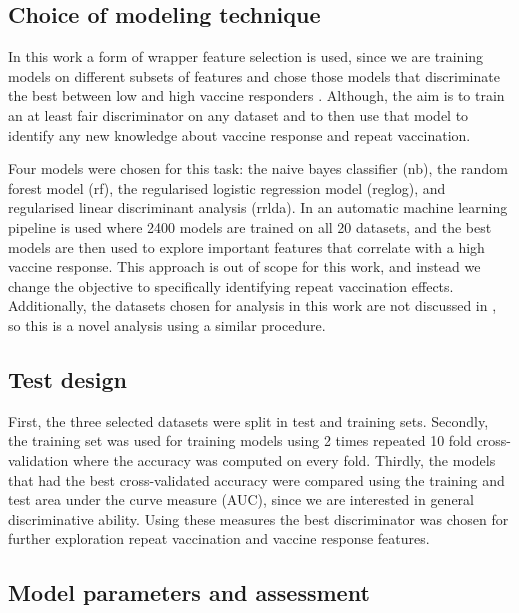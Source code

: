 \subsection{Choice of modeling technique}

In this work a form of wrapper feature selection is used, since we are training models on different subsets of features and chose those models that discriminate the best between low and high vaccine responders \citep{hiraReviewFeatureSelection2015}.
Although, the aim is to train an at least fair discriminator on any dataset and to then use that model to identify any new knowledge about vaccine response and repeat vaccination.

Four models were chosen for this task: the naive bayes classifier (nb), the random forest model (rf), the regularised logistic regression model (reglog), and regularised linear discriminant analysis (rrlda).
In \spaper an automatic machine learning pipeline is used where 2400 models are trained on all 20 datasets, and the best models are then used to explore important features that correlate with a high vaccine response.
This approach is out of scope for this work, and instead we change the objective to specifically identifying repeat vaccination effects.
Additionally, the datasets chosen for analysis in this work are not discussed in \spaper, so this is a novel analysis using a similar procedure.

\subsection{Test design}

First, the three selected datasets were split in test and training sets.
Secondly, the training set was used for training models using 2 times repeated 10 fold cross-validation where the accuracy was computed on every fold.
Thirdly, the models that had the best cross-validated accuracy were compared using the training and test area under the curve measure (AUC), since we are interested in general discriminative ability.
Using these measures the best discriminator was chosen for further exploration repeat vaccination and vaccine response features.

\subsection{Model parameters and assessment}


